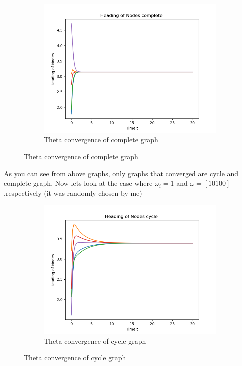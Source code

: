 \documentclass{article}
\begin{document}
\begin{problem}
\begin{figure}[!h]
\begin{subfigure}{0.35\textwidth}
            \includegraphics[width=\textwidth]{./img/p3_complete0.png}
            \caption{Theta convergence of complete graph }
        \end{subfigure}
    \end{figure} 
    \newpage
    As you can see from above graphs, only graphs that converged are cycle and complete graph. Now lets look at the case where $\omega_i = 1$ and $\omega = [1 0 1 0 0]$,respectively  (it was randomly chosen by me)
    \newpage
    \begin{figure}[!h]
        \centering
        \begin{subfigure}{0.35\textwidth}
            \includegraphics[width=\textwidth]{./img/p3_cycle1.png}
            \caption{Theta convergence of cycle graph }

\end{subfigure}
\end{figure}
\end{problem}
\end{document}
